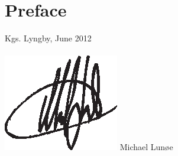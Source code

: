 \chapter{Preface}
%
%

\vspace{20mm}
\mbox{}\hfill
\begin{minipage}[t]{80mm}
  Kgs. Lyngby, June 2012
  \\ \\
  \mbox{} \hspace{-16mm} \includegraphics{img/signature.eps}
  Michael Lunøe
\end{minipage}

